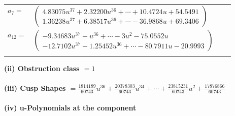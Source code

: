 \documentclass[1p]{elsarticle_modified}
\theoremstyle{definition}
\begin{document}
\begin{tabular}{m{7pt} m{180pt} m{7pt} m{180pt} }
\flushright $a_{7}=$&$\begin{pmatrix}4.83075 u^{37}+2.32200 u^{36}+\cdots+10.4724 u+54.5491\\1.36238 u^{37}+6.38517 u^{36}+\cdots-36.9868 u+69.3406\end{pmatrix}$ \\
\flushright $a_{12}=$&$\begin{pmatrix}-9.34683 u^{37}-u^{36}+\cdots-3 u^{2}-75.0552 u\\-12.7102 u^{37}-1.25452 u^{36}+\cdots-80.7911 u-20.9993\end{pmatrix}$\\&\end{tabular}
\flushleft \textbf{(ii) Obstruction class $= 1$}\\~\\
\flushleft \textbf{(iii) Cusp Shapes $= \frac{1814189}{60743} u^{36}+\frac{20378303}{60743} u^{34}+\cdots+\frac{23815231}{60743} u^2+\frac{17876866}{60743}$}\\~\\
\newpage\renewcommand{\arraystretch}{1}
\flushleft \textbf{(iv) u-Polynomials at the component}\newline \\
\end{document}
